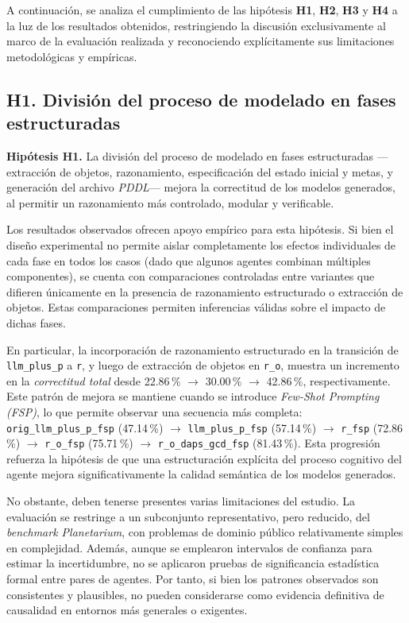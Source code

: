 A continuación, se analiza el cumplimiento de las hipótesis \textbf{H1}, \textbf{H2}, \textbf{H3} y \textbf{H4} a la luz de los resultados obtenidos, restringiendo la discusión exclusivamente al marco de la evaluación realizada y reconociendo explícitamente sus limitaciones metodológicas y empíricas.

\subsection*{H1. División del proceso de modelado en fases estructuradas}

\textbf{Hipótesis H1.} La división del proceso de modelado en fases estructuradas —extracción de objetos, razonamiento, especificación del estado inicial y metas, y generación del archivo \textit{PDDL}— mejora la correctitud de los modelos generados, al permitir un razonamiento más controlado, modular y verificable.

Los resultados observados ofrecen apoyo empírico para esta hipótesis. Si bien el diseño experimental no permite aislar completamente los efectos individuales de cada fase en todos los casos (dado que algunos agentes combinan múltiples componentes), se cuenta con comparaciones controladas entre variantes que difieren únicamente en la presencia de razonamiento estructurado o extracción de objetos. Estas comparaciones permiten inferencias válidas sobre el impacto de dichas fases.

En particular, la incorporación de razonamiento estructurado en la transición de \texttt{llm\_plus\_p} a \texttt{r}, y luego de extracción de objetos en \texttt{r\_o}, muestra un incremento en la \textit{correctitud total} desde 22.86\,\% $\rightarrow$ 30.00\,\% $\rightarrow$ 42.86\,\%, respectivamente. Este patrón de mejora se mantiene cuando se introduce \textit{Few-Shot Prompting (FSP)}, lo que permite observar una secuencia más completa: \texttt{orig\_llm\_plus\_p\_fsp} (47.14\,\%) $\rightarrow$ \texttt{llm\_plus\_p\_fsp} (57.14\,\%) $\rightarrow$ \texttt{r\_fsp} (72.86\,\%) $\rightarrow$ \texttt{r\_o\_fsp} (75.71\,\%) $\rightarrow$ \texttt{r\_o\_daps\_gcd\_fsp} (81.43\,\%). Esta progresión refuerza la hipótesis de que una estructuración explícita del proceso cognitivo del agente mejora significativamente la calidad semántica de los modelos generados.

No obstante, deben tenerse presentes varias limitaciones del estudio. La evaluación se restringe a un subconjunto representativo, pero reducido, del \textit{benchmark Planetarium}, con problemas de dominio público relativamente simples en complejidad. Además, aunque se emplearon intervalos de confianza para estimar la incertidumbre, no se aplicaron pruebas de significancia estadística formal entre pares de agentes. Por tanto, si bien los patrones observados son consistentes y plausibles, no pueden considerarse como evidencia definitiva de causalidad en entornos más generales o exigentes.

